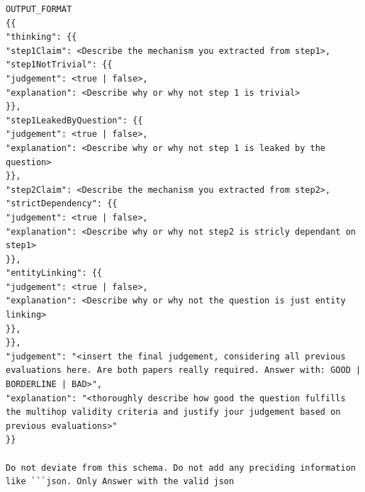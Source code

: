 \begin{lstlisting}[caption={Dependency Strength Prompt}, label={lst:DependencyStrengthPrompt}]
OUTPUT_FORMAT
{{
"thinking": {{
"step1Claim": <Describe the mechanism you extracted from step1>,
"step1NotTrivial": {{
"judgement": <true | false>,
"explanation": <Describe why or why not step 1 is trivial>
}},
"step1LeakedByQuestion": {{
"judgement": <true | false>,
"explanation": <Describe why or why not step 1 is leaked by the question>
}},
"step2Claim": <Describe the mechanism you extracted from step2>,
"strictDependency": {{
"judgement": <true | false>,
"explanation": <Describe why or why not step2 is stricly dependant on step1>
}},
"entityLinking": {{
"judgement": <true | false>,
"explanation": <Describe why or why not the question is just entity linking>
}},
}},
"judgement": "<insert the final judgement, considering all previous evaluations here. Are both papers really required. Answer with: GOOD | BORDERLINE | BAD>",
"explanation": "<thoroughly describe how good the question fulfills the multihop validity criteria and justify jour judgement based on previous evaluations>"
}}

Do not deviate from this schema. Do not add any preciding information like ```json. Only Answer with the valid json

\end{lstlisting}


